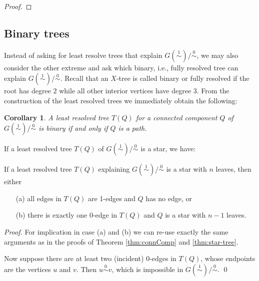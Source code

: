 \documentclass[smallextended]{svjour3}
\newcommand{\Ro}{\mathrel{\overset{0}{\sim}}}
\newcommand{\Rl}{\mathrel{\overset{1}{\sim}}}
\newtheorem{cor}[thm]{Corollary}
\begin{document}
\begin{proof}
%
\end{proof}

\subsection{Binary trees}

Instead of asking for least resolve trees that explain $G(\Rl)/\Ro$, we may
also consider the other extreme and ask which binary, i.e., fully resolved
tree can explain $G(\Rl)/\Ro$. Recall that an $X$-tree is called binary or
fully resolved if the root has degree $2$ while all other interior vertices
have degree $3$.  From the construction of the least resolved trees we
immediately obtain the following:
\begin{cor}
  A least resolved tree $T(Q)$ for a connected component $Q$ of
  $G(\Rl)/\Ro$ is binary if and only if $Q$ is a path.
\end{cor}

If a least resolved tree $T(Q)$ of $G(\Rl)/\Ro$ is a star, we have:
\begin{lemma}\label{lem:star}
  If a least resolved tree $T(Q)$ explaining $G(\Rl)/\Ro$ is a star
  with $n$ leaves, then either
  \begin{itemize}
    \item[(a)] all edges in $T(Q)$ are 1-edges and $Q$ has no edge, or 
    \item[(b)] there is exactly one 0-edge in $T(Q)$ and $Q$ is a star
        with $n-1$ leaves.
    \end{itemize}
  \end{lemma}
\begin{proof}
  For implication in case (a) and (b) we can re-use exactly the same
  arguments as in the proofs of Theorem \ref{thm:connComp} and
  \ref{thm:star-tree}.

  Now suppose there are at least two (incident) 0-edges in $T(Q)$, whose
  endpoints are the vertices $u$ and $v$. Then $u\Ro v$, which is
  impossible in $G(\Rl)/\Ro$.  \qed
\end{proof}
\end{document}
